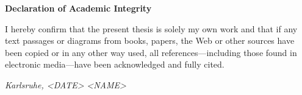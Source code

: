 {\Large \textbf{Declaration of Academic Integrity}} 

\bigskip
I hereby confirm that the present thesis is solely my own work and that if any text passages or diagrams from books, papers, the Web or
other sources have been copied or in any other way used, all references---including those found in
electronic media---have been acknowledged and fully cited. \\



\vspace{1cm}
 
\textit{Karlsruhe, \textless DATE\textgreater} \hspace{4cm} \textit{\textless NAME\textgreater} \\
